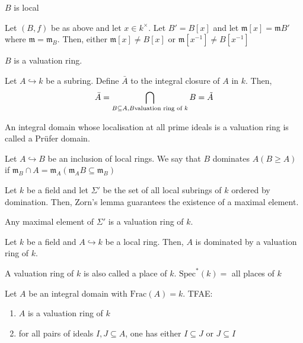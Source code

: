 \documentclass[oneside, 12pt]{scrbook}
\newcommand{\spec}{\mathrm{Spec}}
\newcommand{\m}{\mathfrak{m}}
\theoremstyle{theorem}
\begin{document}
\begin{lemma}
$B$ is local
\end{lemma}

\begin{lemma}
Let $(B,f)$ be as above and let $x \in k^{\times}$. Let $B' = B[x]$ and let $\m[x] = \m B'$ where $\m = \m_{B}$. Then, either $\m[x] \neq B[x]$ or $\m[x^{-1}] \neq B[x^{-1}]$
\end{lemma}

\begin{theorem}
$B$ is a valuation ring.
\end{theorem}

\begin{corollary}
Let $A \hookrightarrow k$ be a subring. Define $\bar{A}$ to the integral closure of $A$ in $k$. Then, $$\bar{A} = \bigcap_{B \subseteq A, \\ B \text{valuation ring of }k}B = \tilde{A}$$
\end{corollary}

\begin{definition}
An integral domain whose localisation at all prime ideals is a valuation ring is called a Pr\"{u}fer domain.
\end{definition}

\begin{definition}
Let $A \hookrightarrow B$ be an inclusion of local rings. We say that $B$ dominates $A (B \geq A)$ if $\m_{B} \cap A = \m_{A} (\m_{A}B \subseteq \m_{B})$ 
\end{definition}

Let $k$ be a field and let $\Sigma'$ be the set of all local subrings of $k$ ordered by domination. Then, Zorn's lemma guarantees the existence of a maximal element. 
\begin{theorem}
Any maximal element of $\Sigma '$ is a valuation ring of $k$.
\end{theorem}

\begin{corollary}
Let $k$ be a field and $A \hookrightarrow k$ be a local ring. Then, $A$ is dominated by a valuation ring of $k$.
\end{corollary}

\begin{remark}
A valuation ring of $k$ is also called a place of $k$. $\spec^*(k) =$ all places of $k$
\end{remark}

\begin{proposition}
Let $A$ be an integral domain with $\mathrm{Frac}(A)=k$. TFAE: 
\begin{enumerate}
\item $A$ is a valuation ring of $k$
\item for all pairs of ideals $I,J \subseteq A$, one has either $I \subseteq J$ or $J \subseteq I$
\end{enumerate}
\end{proposition}
\end{document}
